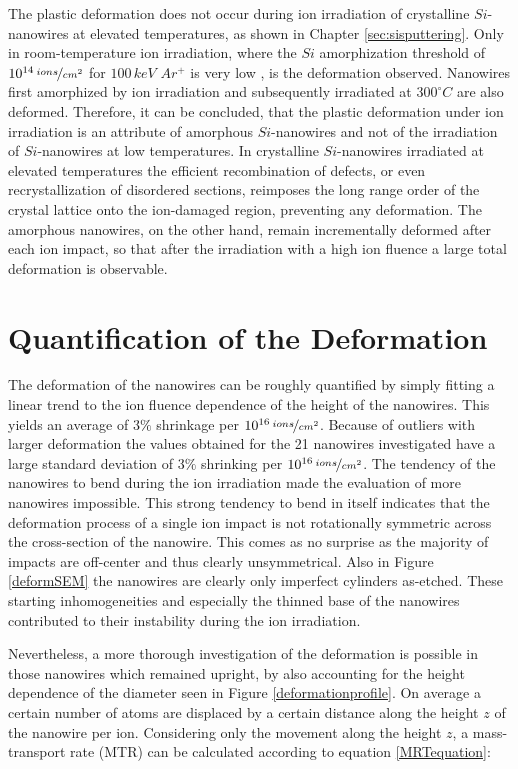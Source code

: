 The plastic deformation does not occur during ion irradiation of crystalline $Si$-nanowires at elevated temperatures, as shown in Chapter \ref{sec:sisputtering}. Only in room-temperature ion irradiation, where the $Si$ amorphization threshold of $10^{14}\,\nicefrac{ions}{cm^2}$ for $100\,keV\,\,Ar^+$ is very low \cite{pelaz_ion-beam-induced_2004}, is the deformation observed. Nanowires first amorphized by ion irradiation and subsequently irradiated at $300^\circ C$ are also deformed. Therefore, it can be concluded, that the plastic deformation under ion irradiation is an attribute of amorphous $Si$-nanowires and not of the irradiation of $Si$-nanowires at low temperatures. In crystalline $Si$-nanowires irradiated at elevated temperatures the efficient recombination of defects, or even recrystallization of disordered sections, reimposes the long range order of the crystal lattice onto the ion-damaged region, preventing any deformation. The amorphous nanowires, on the other hand, remain incrementally deformed after each ion impact, so that after the irradiation with a high ion fluence a large total deformation is observable.


\section{Quantification of the Deformation}
\label{sec:quantifydeformation}

The deformation of the nanowires can be roughly quantified by simply fitting a linear trend to the ion fluence dependence of the height of the nanowires. This yields an average of $3\%$ shrinkage per $10^{16}\,\nicefrac{ions}{cm^2}$. Because of outliers with larger deformation the values obtained for the 21 nanowires investigated have a large standard deviation of $3\%$ shrinking per $10^{16}\,\nicefrac{ions}{cm^2}$. The tendency of the nanowires to bend during the ion irradiation made the evaluation of more nanowires impossible. This strong tendency to bend in itself indicates that the deformation process of a single ion impact is not rotationally symmetric across the cross-section of the nanowire. This comes as no surprise as the majority of impacts are off-center and thus clearly unsymmetrical. Also in Figure \ref{deformSEM} the nanowires are clearly only imperfect cylinders as-etched. These starting inhomogeneities and especially the thinned base of the nanowires contributed to their instability during the ion irradiation.

Nevertheless, a more thorough investigation of the deformation is possible in those nanowires which remained upright, by also accounting for the height dependence of the diameter seen in Figure \ref{deformationprofile}. On average a certain number of atoms are displaced by a certain distance along the height $z$ of the nanowire per ion. Considering only the movement along the height $z$, a mass-transport rate (MTR) can be calculated according to equation \ref{MRTequation}:

